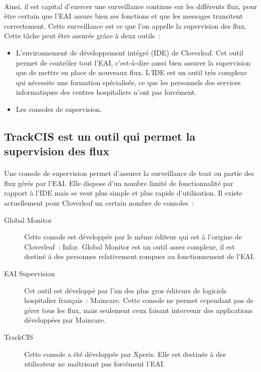 			\paragraph{}%
			Ainsi, il est capital d'exercer une surveillance continue sur les différents
			flux, pour être certain que l'EAI assure bien ses fonctions et que les
			messages transitent correctement. Cette surveillance est ce que l'on appelle
			la supervision des flux. Cette tâche peut être assurée grâce à deux outils~:
			\begin{itemize}
			  \item L'environnement de développement intégré (IDE) de Cloverleaf. Cet
			  outil permet de contrôler tout l'EAI, c'est-à-dire aussi bien assurer la
			  supervision que de mettre en place de nouveaux flux. L'IDE est un outil
			  très complexe qui nécessite une formation spécialisée, ce que les
			  personnels des services informatiques des centres hospitaliers n'ont pas
			  forcément.
			  \item Les consoles de supervision.
			\end{itemize}
			
		\subsection{TrackCIS est un outil qui permet la supervision des flux}
			\paragraph{}%
			Une console de supervision permet d'assurer la surveillance
			de tout ou partie des flux gérés par l'EAI. Elle dispose d'un
			nombre limité de fonctionnalité par rapport à l'IDE mais se veut plus simple
			et plus rapide d'utilisation. Il existe actuellement pour Cloverleaf un
			certain nombre de consoles~:
			\begin{description}
				\item[Global Monitor] Cette console est développée par le même éditeur qui
				est à l'origine de Cloverleaf~: Infor. Global Monitor est un outil assez
				complexe, il est destiné à des personnes relativement rompues au
				fonctionnement de l'EAI.
				\item[EAI Supervision] Cet outil est développé par l'un des plus gros
				éditeurs de logiciels hospitalier français~: Maincare. Cette console ne
				permet cependant pas de gérer tous les flux, mais seulement ceux faisant
				intervenir des applications développées par Maincare.
				\item[TrackCIS] Cette console a été développée par Xperis. Elle est destinée
				à des utilisateur ne maîtrisant pas forcément l'EAI.
			\end{description}
			
